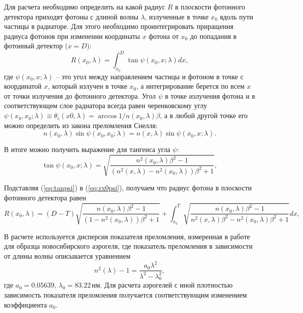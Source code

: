 \documentclass[12pt]{article}
\begin{document}
Для расчета необходимо определить на какой радиус $R$ в плоскости фотонного детектора приходят фотоны с длиной волны $\lambda$, излученные в точке $x_0$ вдоль пути частицы в
радиаторе. Для этого необходимо проинтегрировать приращения радиуса фотонов при изменении координаты $x$ фотона от $x_0$ до попадания в фотонный детектор ($x=D$):
\begin{equation}
R(x_0,\lambda) = \int_{x_0}^D \tan\psi(x_0,x;\lambda) dx,
\label{eq:rx0psi}
\end{equation}
где $\psi(x_0,x;\lambda)$ -- это угол между направлением частицы и фотоном в точке с координатой $x$, который излучен в точке $x_0$, а интегрирование берется по всем $x$ от 
точки излучения до фотонного детектора. Угол $\psi$ в точке излучения фотона и в соответствующем слое радиатора всегда равен черенковскому углу 
$\psi(x_0,x_0;\lambda) \equiv \theta_c(x0,\lambda) = \arccos{1/n(x_0,\lambda)\beta}$, а в любой другой точке его можно определить из закона преломления Снелля:
\[n(x_0,\lambda)\sin\psi(x_0,x_0;\lambda) = n(x,\lambda)\sin\psi(x_0,x;\lambda).\]

В итоге можно получить выражение для тангенса угла $\psi$:
\begin{equation}
\tan\psi(x_0,x;\lambda) = \sqrt{\frac{n^2(x_0,\lambda)\beta^2-1}{(n^2(x,\lambda)-n^2(x_0,\lambda))\beta^2+1}},
\label{eq:tanpsi}
\end{equation}

Подставляя (\ref{eq:tanpsi}) в (\ref{eq:rx0psi}), получаем что радиус фотона в плоскости фотонного детектора равен
\begin{equation}
R(x_0,\lambda) = (D-T)\sqrt{\frac{n(x_0,\lambda)\beta^2-1}{(1-n^2(x_0,\lambda))\beta^2+1}} + 
\int_{x_0}^T \sqrt{\frac{n(x_0,\lambda)\beta^2-1}{n^2(x,\lambda)\beta^2-n^2(x_0,\lambda)\beta^2+1}} dx,
\label{eq:rx0}
\end{equation}

В расчете используется дисперсия показателя преломления, измеренная в работе \cite{aerdisp} для 
образца новосибирского аэрогеля, где показатель преломления в зависимости от длины волны описывается уравнением
\[n^2(\lambda)-1 = \frac{a_0 \lambda^2}{\lambda^2-\lambda_0^2},\]
где $a_0 = 0.05639$, $\lambda_0 = 83.22\,\textrm{нм}$. 
Для расчета аэрогелей с иной плотностью зависимость показателя преломления получается соответствующим изменением 
коэффициента $a_0$.
\end{document}
